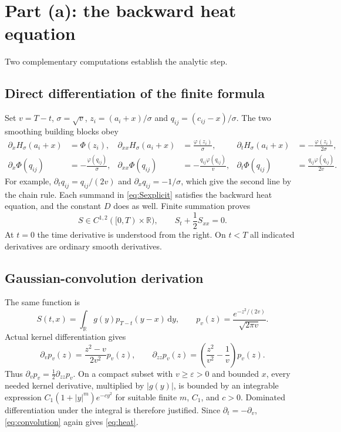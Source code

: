 \documentclass[11pt,letterpaper]{article}
\newcommand{\R}{\mathbb R}
\newcommand{\dd}{\,\mathrm d}
\begin{document}
\section{Part (a): the backward heat equation}
Two complementary computations establish the analytic step.

\subsection*{Direct differentiation of the finite formula}
Set $v=T-t$, $\sigma=\sqrt v$, $z_i=(a_i+x)/\sigma$ and $q_{ij}=(c_{ij}-x)/\sigma$. The two smoothing building blocks obey
\begin{align}
\partial_xH_\sigma(a_i+x)&=\Phi(z_i),&
\partial_{xx}H_\sigma(a_i+x)&=\frac{\varphi(z_i)}\sigma,&
\partial_tH_\sigma(a_i+x)&=-\frac{\varphi(z_i)}{2\sigma},\label{eq:callDerivs}\\
\partial_x\Phi(q_{ij})&=-\frac{\varphi(q_{ij})}\sigma,&
\partial_{xx}\Phi(q_{ij})&=-\frac{q_{ij}\varphi(q_{ij})}{v},&
\partial_t\Phi(q_{ij})&=\frac{q_{ij}\varphi(q_{ij})}{2v}.\label{eq:digitalDerivs}
\end{align}
For example, $\partial_tq_{ij}=q_{ij}/(2v)$ and $\partial_xq_{ij}=-1/\sigma$, which give the second line by the chain rule. Each summand in \eqref{eq:Sexplicit} satisfies the backward heat equation, and the constant $D$ does as well. Finite summation proves
\begin{equation}\label{eq:heat}
\boxed{S\in C^{1,2}([0,T)\times\R),\qquad S_t+\frac12S_{xx}=0.}
\end{equation}
At $t=0$ the time derivative is understood from the right. On $t<T$ all indicated derivatives are ordinary smooth derivatives.

\subsection*{Gaussian-convolution derivation}
The same function is
\begin{equation}\label{eq:convolution}
S(t,x)=\int_{\R}g(y)p_{T-t}(y-x)\dd y,
\qquad p_v(z)=\frac{e^{-z^2/(2v)}}{\sqrt{2\pi v}}.
\end{equation}
Actual kernel differentiation gives
\begin{equation}\label{eq:kernel}
\partial_vp_v(z)=\frac{z^2-v}{2v^2}p_v(z),
\qquad
\partial_{zz}p_v(z)=\left(\frac{z^2}{v^2}-\frac1v\right)p_v(z).
\end{equation}
Thus $\partial_vp_v=\tfrac12\partial_{zz}p_v$. On a compact subset with $v\ge\varepsilon>0$ and bounded $x$, every needed kernel derivative, multiplied by $|g(y)|$, is bounded by an integrable expression $C_1(1+|y|^m)e^{-c y^2}$ for suitable finite $m$, $C_1$, and $c>0$. Dominated differentiation under the integral is therefore justified. Since $\partial_t=-\partial_v$, \eqref{eq:convolution} again gives \eqref{eq:heat}.
\end{document}
